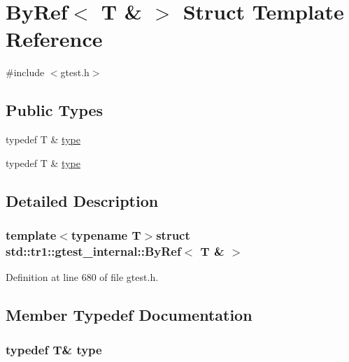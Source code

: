 \hypertarget{structstd_1_1tr1_1_1gtest__internal_1_1ByRef_3_01T_01_6_01_4}{\section{\-By\-Ref$<$ \-T \& $>$ \-Struct \-Template \-Reference}
\label{df/de2/structstd_1_1tr1_1_1gtest__internal_1_1ByRef_3_01T_01_6_01_4}
}


{\ttfamily \#include $<$gtest.\-h$>$}

\subsection*{\-Public \-Types}
\begin{DoxyCompactItemize}
\item 
typedef \-T \& \hyperlink{structstd_1_1tr1_1_1gtest__internal_1_1ByRef_3_01T_01_6_01_4_a08e05528fbb401bd8299a21d67d13ee3}{type}
\item 
typedef \-T \& \hyperlink{structstd_1_1tr1_1_1gtest__internal_1_1ByRef_3_01T_01_6_01_4_a08e05528fbb401bd8299a21d67d13ee3}{type}
\end{DoxyCompactItemize}


\subsection{\-Detailed \-Description}
\subsubsection*{template$<$typename T$>$struct std\-::tr1\-::gtest\-\_\-internal\-::\-By\-Ref$<$ T \& $>$}



\-Definition at line 680 of file gtest.\-h.



\subsection{\-Member \-Typedef \-Documentation}
\hypertarget{structstd_1_1tr1_1_1gtest__internal_1_1ByRef_3_01T_01_6_01_4_a08e05528fbb401bd8299a21d67d13ee3}{
\subsubsection[{type}]{\setlength{\rightskip}{0pt plus 5cm}typedef \-T\& {\bf type}}}\label{df/de2/structstd_1_1tr1_1_1gtest__internal_1_1ByRef_3_01T_01_6_01_4_a08e05528fbb401bd8299a21d67d13ee3}


